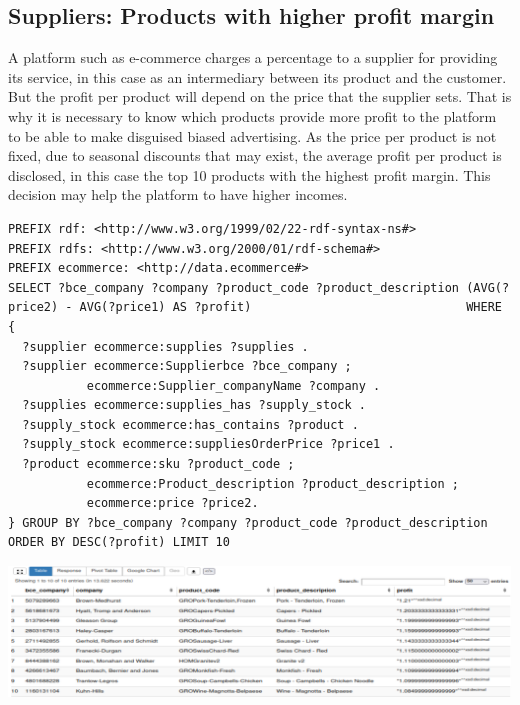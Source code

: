 \documentclass{article}
\begin{document}
\newpage

\subsection{Suppliers: Products with higher profit margin}
A platform such as e-commerce charges a percentage to a supplier for providing its service, in this case as an intermediary between its product and the customer. But the profit per product will depend on the price that the supplier sets. That is why it is necessary to know which products provide more profit to the platform to be able to make disguised biased advertising. As the price per product is not fixed, due to seasonal discounts that may exist, the average profit per product is disclosed, in this case the top 10 products with the highest profit margin. This decision may help the platform to have higher incomes. \\

\begin{lstlisting}[breaklines, frame=single]
PREFIX rdf: <http://www.w3.org/1999/02/22-rdf-syntax-ns#>
PREFIX rdfs: <http://www.w3.org/2000/01/rdf-schema#>
PREFIX ecommerce: <http://data.ecommerce#>
SELECT ?bce_company ?company ?product_code ?product_description (AVG(?price2) - AVG(?price1) AS ?profit)                              WHERE {
  ?supplier ecommerce:supplies ?supplies .
  ?supplier ecommerce:Supplierbce ?bce_company ;
           ecommerce:Supplier_companyName ?company .
  ?supplies ecommerce:supplies_has ?supply_stock .
  ?supply_stock ecommerce:has_contains ?product .
  ?supply_stock ecommerce:suppliesOrderPrice ?price1 .
  ?product ecommerce:sku ?product_code ;
           ecommerce:Product_description ?product_description ;
           ecommerce:price ?price2.
} GROUP BY ?bce_company ?company ?product_code ?product_description ORDER BY DESC(?profit) LIMIT 10
\end{lstlisting}

\begin{center}
   \includegraphics[scale=0.25]{OISreport-supplier-query.png}
\end{center}
\end{document}
